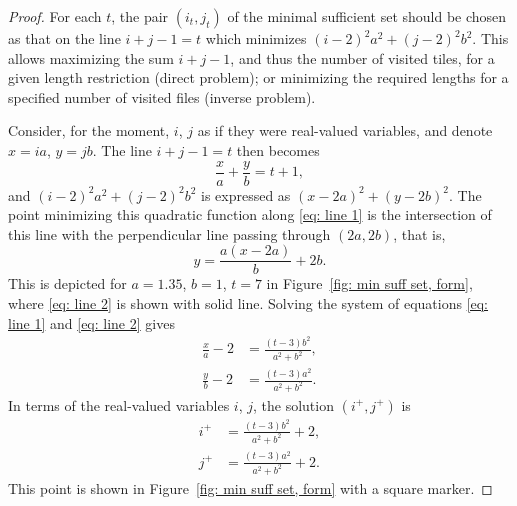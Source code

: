 \documentclass[12pt, a4paper]{article}
\newcommand{\tiles}{t} %
\newcommand{\isolr}{i^+}
\newcommand{\jsolr}{j^+}
\begin{document}
\begin{proof}
For each $\tiles$, the pair $(i_\tiles,j_\tiles)$ of the minimal sufficient set should be chosen as that on the line $i+j-1=\tiles$ which minimizes $(i-2)^2 a^2 + (j-2)^2 b^2$. This allows maximizing the sum $i+j-1$, and thus the number of visited tiles, for a given length restriction (direct problem); or minimizing the required lengths for a specified number of visited files (inverse problem).

Consider, for the moment, $i$, $j$ as if they were real-valued variables, and denote $x=ia$, $y=jb$. The line $i+j-1 = \tiles$ then becomes
\begin{equation}
\label{eq: line 1}
\frac x a + \frac y b = \tiles + 1,
\end{equation}
and $(i-2)^2 a^2 + (j-2)^2 b^2$ is expressed as $(x-2a)^2+(y-2b)^2$. The point minimizing this quadratic function along \eqref{eq: line 1} is the intersection of this line with the perpendicular line passing through $(2a,2b)$, that is,
\begin{equation}
\label{eq: line 2}
y = \frac {a (x-2a)} b + 2b.
\end{equation}
This is depicted for $a=1.35$, $b=1$, $\tiles=7$ in Figure~\ref{fig: min suff set, form}, where \eqref{eq: line 2} is shown with solid line. Solving the system of equations \eqref{eq: line 1} and \eqref{eq: line 2} gives 
\begin{align}
\frac x a - 2 &= \frac{(t-3)b^2}{a^2+b^2}, \\
\frac y b - 2 &= \frac{(t-3)a^2}{a^2+b^2}.
\end{align}
In terms of the real-valued variables $i$, $j$, the solution $(\isolr, \jsolr)$ is
\begin{align}
\label{eq: prop: min suff set, form: isolr}
\isolr &= \frac{(t-3)b^2}{a^2+b^2} + 2, \\
\label{eq: prop: min suff set, form: jsolr}
\jsolr &= \frac{(t-3)a^2}{a^2+b^2} + 2.
\end{align}
This point is shown in Figure~\ref{fig: min suff set, form} with a square marker.


\end{proof}
\end{document}
